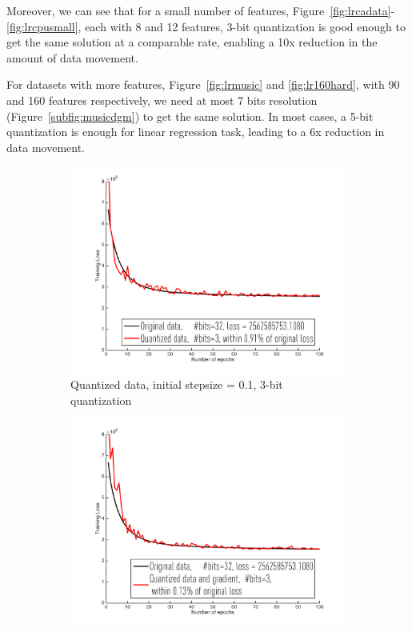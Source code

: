 \documentclass{article}
\begin{document}
Moreover, we can see that for a small number of features, Figure~\ref{fig:lrcadata}-\ref{fig:lrcpusmall}, each with 8 and 12 features, 3-bit quantization is good enough to get the same solution at a comparable rate, enabling a 10x reduction in the amount of data movement.

For datasets with more features, Figure~\ref{fig:lrmusic} and \ref{fig:lr160hard}, with 90 and 160 features respectively, we need at most 7 bits resolution (Figure~\ref{subfig:musicdgm}) to get the same solution. In most cases, a 5-bit quantization is enough for linear regression task, leading to a 6x reduction in data movement.

\begin{figure}[h]
\centering

    \begin{subfigure}[h]{.3\columnwidth}
    \includegraphics[width=\columnwidth]{lr/real/cadata/d01}
    \caption{Quantized data, initial stepsize = 0.1, 3-bit quantization}
    \end{subfigure}
    \begin{subfigure}[h]{.3\columnwidth}
    \includegraphics[width=\columnwidth]{lr/real/cadata/dg01}

\end{subfigure}
\end{figure}
\end{document}
